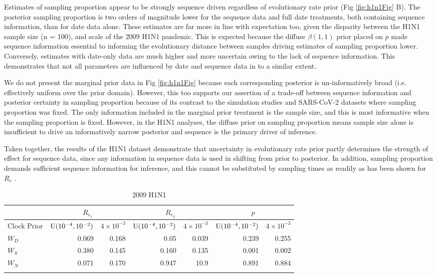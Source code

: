 \documentclass{article}
\begin{document}
Estimates of sampling proportion appear to be strongly sequence driven regardless of evolutionary rate prior (Fig \ref{fig:h1n1Fig} B). The posterior sampling proportion is two orders of magnitude lower for the sequence data and full date treatments, both containing sequence information, than for date data alone. These estimates are far more in line with expectation too, given the disparity between the H1N1 sample size (n = 100), and scale of the 2009 H1N1 pandemic. This is expected because the diffuse $\beta(1, 1)$ prior placed on $p$ made sequence information essential to informing the evolutionary distance between samples driving estimates of sampling proportion lower. Conversely, estimates with date-only data are much higher and more uncertain owing to the lack of sequence information. This demonstrates that not all parameters are influenced by date and sequence data in to a similar extent.

We do not present the marginal prior data in Fig \ref{fig:h1n1Fig} because each corresponding posterior is un-informatively broad (i.e. effectively uniform over the prior domain). However, this too supports our assertion of a trade-off between sequence information and posterior certainty in sampling proportion because of its contrast to the simulation studies and SARS-CoV-2 datasets where sampling proportion was fixed. The only information included in the marginal prior treatment is the sample size, and this is most informative when the sampling proportion is fixed. However, in the H1N1 analyses, the diffuse prior on sampling proportion means sample size alone is insufficient to drive an informatively narrow posterior and sequence is the primary driver of inference.

Taken together, the results of the H1N1 dataset demonstrate that uncertainty in evolutionary rate prior partly determines the strength of effect for sequence data, since any information in sequence data is used in shifting from prior to posterior. In addition, sampling proportion demands sufficient sequence information for inference, and this cannot be substituted by sampling times as readily as has been shown for $R_e$ \cite{Featherstone2021Infectious,volz_sampling_2014}.

\begin{table}[H]
\centering
\caption{2009 H1N1}
\begin{tabular}{lrrrrrr}
\midrule
& \multicolumn{2}{c}{\textbf{$R_{e_1}$}} & \multicolumn{2}{|c|}{\textbf{$R_{e_2}$}} &
\multicolumn{2}{c}{\textbf{$p$}}\\
\midrule
Clock Prior  & $\textnormal{U}(10^{-4}, 10^{-2})$ & $4\times10^{-3}$ & $\textnormal{U}(10^{-4}, 10^{-2})$ & $4\times10^{-3}$ & $\textnormal{U}(10^{-4}, 10^{-2})$ & $4\times10^{-3}$ \\
\midrule
$W_{D}$   &   0.069   &  0.168   &   0.05    &  0.039  & 0.239 & 0.255 \\
$W_{S}$   &   0.380   &  0.145   &   0.160   &  0.135  & 0.001 & 0.002\\ 
$W_{N}$   &   0.071   &  0.170   &    0.947  &  10.9   & 0.891 & 0.884\\
\bottomrule 
\label{tab:h1n1Tab}
\end{tabular}
\end{table}
\end{document}
